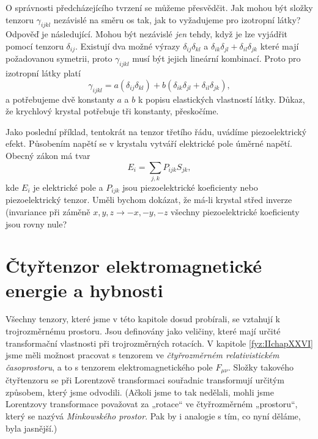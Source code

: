 {    O správnosti předcházejícího tvrzení se můžeme přesvědčit. Jak mohou být složky tenzoru
    \(\gamma_{ijkl}\) nezávislé na směru os tak, jak to vyžadujeme pro izotropní látky? Odpověď je
    následující. Mohou být nezávislé \emph{jen} tehdy, když je lze vyjádřit pomocí tenzoru
    \(\delta_{ij}\). Existují dva možné výrazy \(\delta_{ij}\delta_{kl}\) a
    \(\delta_{ik}\delta_{jl}+\delta_{il}\delta_{jk}\) které mají požadovanou symetrii, proto
    \(\gamma_{ijkl}\) musí být jejich lineární kombinací. Proto pro izotropní látky platí
    \begin{equation*}
      \gamma_{ijkl}=a(\delta_{ij}\delta_{kl})+b(\delta_{ik}\delta_{jl}+\delta_{il}\delta_{jk}),
    \end{equation*}
    a potřebujeme dvě konstanty \(a\) a \(b\) k popisu elastických vlastností látky. Důkaz, že
    krychlový krystal potřebuje tři konstanty, přeskočíme.
    
    Jako poslední příklad, tentokrát na tenzor třetího řádu, uvádíme piezoelektrický efekt.
    Působením napětí se v krystalu vytváří elektrické pole úměrné napětí. Obecný zákon má tvar
    \begin{equation*}
      E_i=\sum_{j,k}P_{ijk}S_{jk},
    \end{equation*}
    kde \(E_i\) je elektrické pole a \(P_{ijk}\) jsou piezoelektrické koeficienty nebo
    piezoelektrický tenzor. Uměli bychom dokázat, že má-li krystal střed inverze (invariance při
    záměně \(x,y,z\to-x,-y,-z\) všechny piezoelektrické koeficienty jsou rovny nule?

  \section{Čtyřtenzor elektromagnetické energie a hybnosti}\label{fyz:IIchapXXXIsecVIII} 
    Všechny tenzory, které jsme v této kapitole dosud probírali, se vztahují k trojrozměrnému
    prostoru. Jsou definovány jako veličiny, které mají určité transformační vlastnosti při
    trojrozměrných rotacích. V kapitole \ref{fyz:IIchapXXVI} jsme měli možnost pracovat s tenzorem
    ve \emph{čtyřrozměrném relativistickém časoprostoru}, a to s tenzorem elektromagnetického pole
    \(F_{\mu\nu}\). Složky takového čtyřtenzoru se při Lorentzově transformaci souřadnic
    transformují určitým způsobem, který jsme odvodili. (Ačkoli jsme to tak nedělali, mohli jsme
    Lorentzovy transformace považovat za „rotace“ ve čtyřrozměrném „prostoru“, který se nazývá
    \emph{Minkowského prostor}. Pak by i analogie s tím, co nyní děláme, byla jasnější.)
    
}

